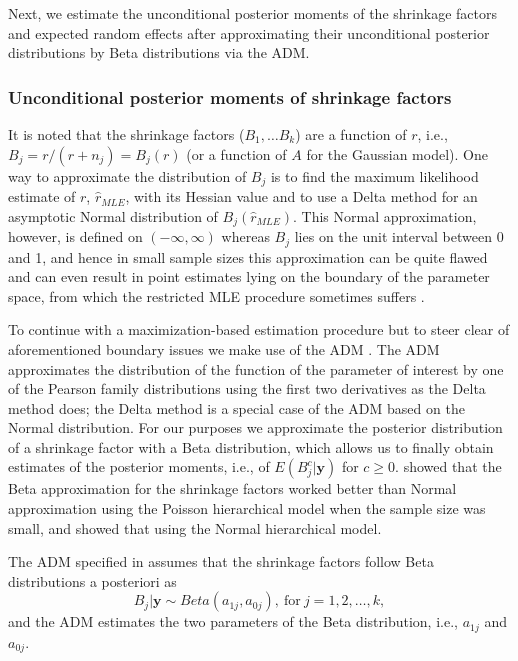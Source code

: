 \documentclass[article]{jss}
\begin{document}
Next, we estimate the unconditional posterior moments of the shrinkage factors and expected random effects after approximating their unconditional posterior distributions by Beta distributions via the ADM. 

\subsubsection{Unconditional posterior moments of shrinkage factors}  It is noted that  the shrinkage factors ($B_1, \ldots B_k$) are a function of $r$, i.e., $B_{j}= r/(r+n_{j})=B_{j}(r)$ (or a function of $A$ for the Gaussian model). One way to approximate the distribution of $B_{j}$ is to find the maximum likelihood estimate of $r$, $\hat{r}_{MLE}$, with its Hessian value and to use a Delta method for an asymptotic Normal distribution of $B_{j}(\hat{r}_{MLE})$. This Normal approximation, however, is defined on $(-\infty, \infty)$ whereas $B_{j}$ lies on the unit interval between 0 and 1, and hence in small sample sizes this approximation can be quite flawed and can even result in point estimates lying on the boundary of the parameter space, from which the restricted MLE procedure sometimes suffers \citep{tang2011, kelly2014advances}.

To continue with a maximization-based estimation procedure but to steer clear of aforementioned boundary issues we make use of the ADM \citep{carl1988, morris1997, tang2011}. The ADM approximates the distribution of the function of the parameter of interest by one of the Pearson family distributions using the first two derivatives as the Delta method does; the Delta method is a special case of the ADM based on the Normal distribution. For our purposes we approximate the posterior distribution of a shrinkage factor with a Beta distribution, which allows us to finally obtain estimates of the posterior moments, i.e.,  of $E(B_{j}^c\vert\boldsymbol{y})$ for $c\ge0$.  \citet{morris1997} showed that the Beta approximation for the shrinkage factors worked better than Normal approximation using the Poisson hierarchical model when the sample size was small, and \citet{tang2011} showed that  using the Normal hierarchical model. 

The ADM specified in \cite{tang2011} assumes that the shrinkage factors follow Beta distributions a posteriori as
\begin{equation}\label{admshrinkage}
B_j\vert\boldsymbol{y}\sim Beta(a_{1j}, a_{0j}), ~\textrm{for}~j=1, 2, \ldots, k,
\end{equation}
and the ADM estimates the two parameters of the Beta distribution, i.e., $a_{1j}$ and $a_{0j}$.
\end{document}
